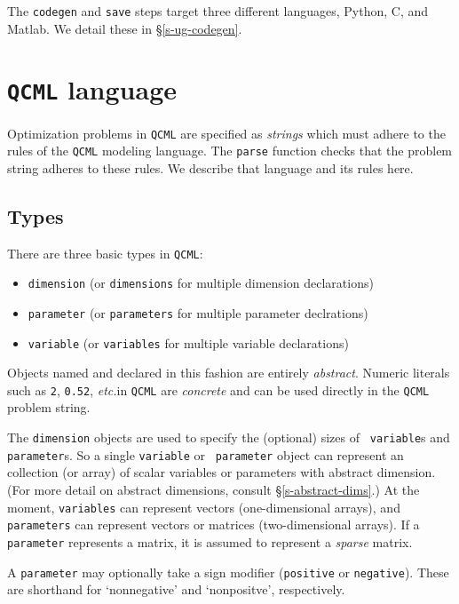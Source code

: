 \documentclass[11pt]{article}
\def\qcml{\texttt{QCML}\xspace}
\newcommand{\etc}{{\it etc.}}
\begin{document}
The {\tt codegen} and {\tt save} steps target three different languages, 
Python, C, and Matlab. We detail these in \S\ref{s-ug-codegen}.

\section{\qcml language}
\label{s-ug-language}
Optimization problems in \qcml are specified as \emph{strings} which must adhere to 
the rules of the \qcml modeling language. The {\tt parse} function checks that
the problem string adheres to these rules. We describe that language and its
rules here.

\subsection{Types}
There are three basic types in \qcml:
\begin{itemize}
\item {\tt dimension} (or {\tt dimensions} for multiple dimension declarations)
\item {\tt parameter} (or {\tt parameters} for multiple parameter declrations)
\item {\tt variable} (or {\tt variables} for multiple variable declarations)
\end{itemize}
Objects named and declared in this fashion are entirely \emph{abstract}.
Numeric literals such as {\tt 2}, {\tt 0.52}, \etc in \qcml are
\emph{concrete} and can be used directly in the \qcml problem string. 

The {\tt dimension} objects are used to specify the (optional) sizes of {\tt
variable}s and {\tt parameter}s. So a single {\tt variable} or {\tt
parameter} object can represent an collection (or array) of scalar variables
or parameters with abstract dimension. (For more detail on abstract
dimensions, consult \S\ref{s-abstract-dims}.) At the moment, {\tt variables}
can represent vectors (one-dimensional arrays), and {\tt parameters} can
represent vectors or matrices (two-dimensional arrays). If a {\tt parameter}
represents a matrix, it is assumed to represent a \emph{sparse} matrix.

A {\tt parameter} may optionally take a sign modifier ({\tt positive} or 
{\tt negative}). These are shorthand for `nonnegative' and `nonpositve', 
respectively.
\end{document}
